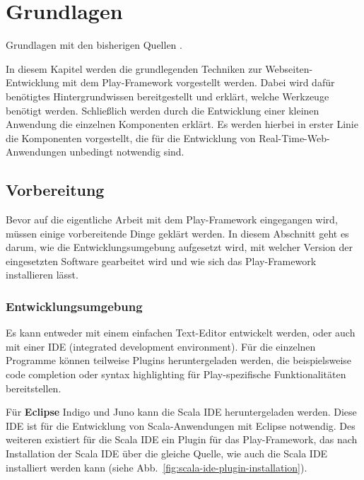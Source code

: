 
\chapter{Grundlagen} %
\label{cha:grundlagen}

Grundlagen mit den bisherigen Quellen \citealt{hilton2013}.

In diesem Kapitel werden die grundlegenden Techniken zur Webseiten-Entwicklung mit dem Play-Framework vorgestellt werden.
Dabei wird dafür benötigtes Hintergrundwissen bereitgestellt und erklärt, welche Werkzeuge benötigt werden.
Schließlich werden durch die Entwicklung einer kleinen Anwendung die einzelnen Komponenten erklärt.
Es werden hierbei in erster Linie die Komponenten vorgestellt, die für die Entwicklung von Real-Time-Web-Anwendungen unbedingt notwendig sind.


\section{Vorbereitung} %
\label{sec:vorbereitung}

Bevor auf die eigentliche Arbeit mit dem Play-Framework eingegangen wird, müssen einige vorbereitende Dinge geklärt werden. In diesem Abschnitt geht es darum, wie die Entwicklungsumgebung aufgesetzt wird, mit welcher Version der eingesetzten Software gearbeitet wird und wie sich das Play-Framework installieren lässt.

\subsection{Entwicklungsumgebung} %
\label{sub:entwicklungsumgebung}

Es kann entweder mit einem einfachen Text-Editor entwickelt werden, oder auch mit einer IDE (integrated development environment).
Für die einzelnen Programme können teilweise Plugins heruntergeladen werden, die beispielsweise code completion oder syntax highlighting für Play-spezifische Funktionalitäten bereitstellen.

Für \textbf{Eclipse} Indigo und Juno kann die Scala IDE heruntergeladen werden.
Diese IDE ist für die Entwicklung von Scala-Anwendungen mit Eclipse notwendig.
Des weiteren existiert für die Scala IDE ein Plugin für das Play-Framework, das nach Installation der Scala IDE über die gleiche Quelle, wie auch die Scala IDE installiert werden kann (siehe Abb.~\ref{fig:scala-ide-plugin-installation}).

